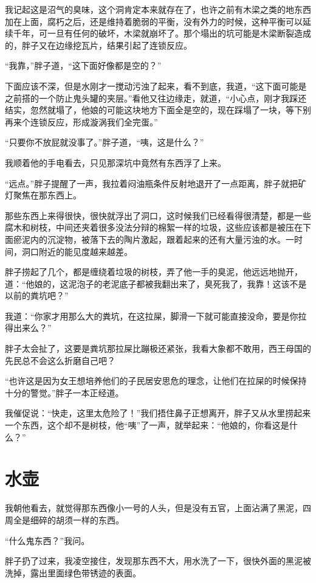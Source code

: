 我记起这是沼气的臭味，这个洞肯定本来就存在了，也许之前有木梁之类的地东西加在上面，腐朽之后，还是维持着脆弱的平衡，没有外力的时候，这种平衡可以延续千年，可一旦有任何的破坏，木梁就崩坏了。那个塌出的坑可能是木梁断裂造成的，胖子又在边缘挖瓦片，结果引起了连锁反应。

“我靠，”胖子道，“这下面好像都是空的？”

下面应该不深，但是水刚才一搅动污浊了起来，看不到底，我道，“这下面可能是之前搭的一个防止鬼头罐的夹层。”看他又往边缘走，就道，“小心点，刚才我踩还结实，忽然就塌了，他娘的可能这块地方下面全是空的，现在踩塌了一块，等下别再来个连锁反应，形成漩涡我们全完蛋。”

“只要你不放屁就没事了。”胖子道，“咦，这是什么？”

我顺着他的手电看去，只见那深坑中竟然有东西浮了上来。

“远点。”胖子提醒了一声，我拉着闷油瓶条件反射地退开了一点距离，胖子就把矿灯聚焦在那东西上。

那些东西上来得很快，很快就浮出了洞口，这时候我们已经看得很清楚，都是一些腐木和树枝，中间还夹着很多没法分辩的棉絮一样的垃圾，这些应该都是被压在下面瘀泥内的沉淀物，被落下去的陶片激起，跟着起来的还有大量污浊的水。一时间，洞口附近的能见度越来越差。

胖子捞起了几个，都是缠绕着垃圾的树枝，弄了他一手的臭泥，他远远地抛开，道：“他娘的，这泥泡子的老泥底子都被我翻出来了，臭死我了，我靠！这该不是以前的粪坑吧？”

我道：“你家才用那么大的粪坑，在这拉屎，脚滑一下就可能直接没命，要是你拉得出来么？”

胖子太会扯了，这要是粪坑那拉屎比蹦极还紧张，我看大象都不敢用，西王母国的先民总不会这么折磨自己吧？

“也许这是因为女王想培养他们的子民居安思危的理念，让他们在拉屎的时候保持十分的警觉。”胖子一本正经道。

我催促说：“快走，这里太危险了！”我们捂住鼻子正想离开，胖子又从水里捞起来一个东西，这个却不是树枝，他“咦”了一声，就举起来：“他娘的，你看这是什么？”

\chapter{水壶}

我朝他看去，就觉得那东西像小一号的人头，但是没有五官，上面沾满了黑泥，四周全是细碎的胡须一样的东西。

“什么鬼东西？”我问。

胖子扔了过来，我凌空接住，发现那东西不大，用水洗了一下，很快外面的黑泥被洗掉，露出里面绿色带锈迹的表面。

